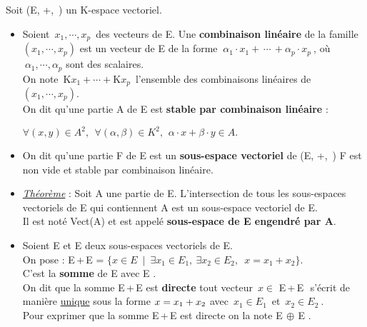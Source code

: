 \noindent Soit (E, +,\ \lce ) un K-espace vectoriel.
\vspace{-0.1cm}
\begin{itemize}[leftmargin=0.5cm, label=•]
    \item Soient $\,x_1,\cdots,x_p\,$ des vecteurs de E. Une \textbf{combinaison linéaire} de la famille $(x_1,\cdots,x_p)$ est un vecteur de E de la forme \(\ \alpha_1 \cdot x_1 + \, \cdots \, + \alpha_p \cdot x_p\ \), où \(\ \alpha_1,\cdots, \alpha_p \) sont des scalaires. \vspace{0.1cm}\\
    On note $\,\text{K}x_1+\cdots+\text{K}x_p\,$ l'ensemble des combinaisons linéaires de $(x_1,\cdots,x_p)$.\vspace{0.2cm} \\
    On dit qu'une partie A de E est \textbf{stable par combinaison linéaire} \ssi :

    \hspace{4cm} \(\forall (x,y)\in A^2,\ \ \forall (\alpha,\beta) \in K^2,\ \,\alpha \cdot x+ \beta \cdot y \in A. \) \vspace{0.3cm}

    \item On dit qu'une partie F de E est un \textbf{sous-espace vectoriel} de (E, +,\ \lce ) \ssi F est non vide et stable par combinaison linéaire.\vspace{0.3cm}

    \item \underline{\emph{Théorème}} : Soit A une partie de E. L'intersection de tous les sous-espaces vectoriels de E qui contiennent A est un sous-espace vectoriel de E. \\
    Il est noté Vect(A) et est appelé \textbf{sous-espace de E engendré par A}.\vspace{0.3cm}

    \item Soient E et E deux sous-espaces vectoriels de E. \vspace{0.1cm}\\
    On pose : E\,+\,E = \(\{ x\in E \ \; \vert \ \; \exists x_1 \in E_1,\ \exists x_2 \in E_2, \; \ x = x_1 + x_2 \}. \)\vspace{0.1cm}\\
    C'est la \textbf{somme} de E avec E .\vspace{0.1cm} \\
    On dit que la somme E\,+\,E est \textbf{directe} \ssi tout vecteur \(\,x \in \) E\,+\,E\ \,s'écrit de manière \underline{unique} sous la forme  \(x=x\textsubscript{1} + x\textsubscript{2}\)  avec \(\, x_1 \in  E_1\, \) et \(\, x_2 \in  E_2\ \).\vspace{0.1cm}\\ 
    Pour exprimer que la somme E\,+\,E est directe on la note E\(\,\oplus\,\)E .\vspace{0.3cm}\\
    

\end{itemize}
